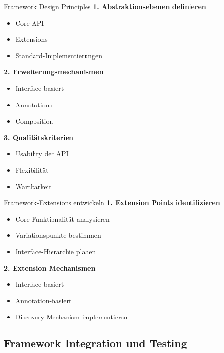 \begin{KR}{Framework Design Principles}
\textbf{1. Abstraktionsebenen definieren}
\begin{itemize}
    \item Core API
    \item Extensions
    \item Standard-Implementierungen
\end{itemize}

\textbf{2. Erweiterungsmechanismen}
\begin{itemize}
    \item Interface-basiert
    \item Annotations
    \item Composition
\end{itemize}

\textbf{3. Qualitätskriterien}
\begin{itemize}
    \item Usability der API
    \item Flexibilität
    \item Wartbarkeit
\end{itemize}
\end{KR}

\begin{KR}{Framework-Extensions entwickeln}
\textbf{1. Extension Points identifizieren}
\begin{itemize}
    \item Core-Funktionalität analysieren
    \item Variationspunkte bestimmen
    \item Interface-Hierarchie planen
\end{itemize}

\textbf{2. Extension Mechanismen}
\begin{itemize}
    \item Interface-basiert
    \item Annotation-basiert
    \item Discovery Mechanism implementieren
\end{itemize}
\end{KR}

\subsection{Framework Integration und Testing}

